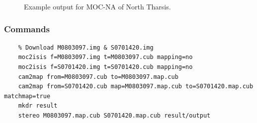 \begin{figure}[h!]
\centering
  \hfil
\caption{Example output for MOC-NA of North Tharsis.}
\label{fig:mocna_n_tharsis_example}
\end{figure}

\subsubsection*{Commands}

\begin{verbatim}
    % Download M0803097.img & S0701420.img
    moc2isis f=M0803097.img t=M0803097.cub mapping=no
    moc2isis f=S0701420.img t=S0701420.cub mapping=no
    cam2map from=M0803097.cub to=M0803097.map.cub
    cam2map from=S0701420.cub map=M0803097.map.cub to=S0701420.map.cub matchmap=true
    mkdr result
    stereo M0803097.map.cub S0701420.map.cub result/output
\end{verbatim}

